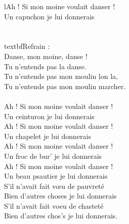 
 lAh ! Si mon moine voulait danser ! \bissimple
\\Un capuchon je lui donnerais \bissimple
\\\\\\textbf{Refrain :}
\\Danse, mon moine, danse !
\\Tu n'entends pas la danse.
\\Tu n'entends pas mon moulin lon la,
\\Tu n'entends pas mon moulin marcher.
\\\\Ah ! Si mon moine voulait danser ! \bissimple
\\Un ceinturon je lui donnerais \bissimple
\\Ah ! Si mon moine voulait danser ! \bissimple
\\Un chapelet je lui donnerais \bissimple
\\Ah ! Si mon moine voulait danser ! \bissimple
\\Un froc de bur' je lui donnerais \bissimple
\\Ah ! Si mon moine voulait danser ! \bissimple
\\Un beau psautier je lui donnerais \bissimple
\\S'il n'avait fait vœu de pauvreté \bissimple
\\Bien d'autres choses je lui donnerais \bissimple
\\S'il n'avait fait voeu de chasteté  \bissimple
\\Bien d'autres chos's je lui donnerais.  \bissimple



\breakpage